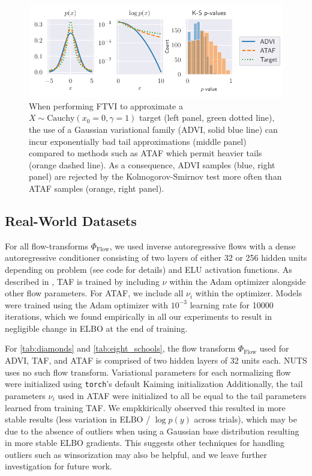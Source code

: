 \documentclass[../../thesis.tex]{subfiles}
\begin{document}
\begin{figure}[htbp]
  \centering
  \includegraphics{ftvi/Figures/fat_tail_ks.pdf}
  \caption{
    When performing FTVI to approximate a $X \sim \text{Cauchy}(x_0 = 0, \gamma = 1)$ target (left panel, green dotted line),
    the use of a Gaussian variational family (ADVI, solid blue line) can incur
    exponentially bad tail approximations (middle panel) compared to
    methods such as ATAF which permit heavier tails (orange dashed line).
    As a consequence, ADVI samples (blue, right panel) are rejected by
    the Kolmogorov-Smirnov test more often than ATAF samples (orange, right panel).
  }
  \label{fig:cauchy_normal_student}
\end{figure}

\subsection{Real-World Datasets}

For all flow-transforms $\Phi_{\text{Flow}}$, we used inverse autoregressive flows \citep{kingma2016improved} with a
dense autoregressive conditioner consisting of two layers of either 32 or 256 hidden units depending on problem (see code for details) and
ELU activation functions.
As described in \citet{jaini2020tails}, TAF is trained by including $\nu$ within the Adam optimizer alongside other flow parameters. For ATAF, we include all $\nu_i$ within the optimizer.
Models were trained using the Adam optimizer with $10^{-3}$ learning rate
for 10000 iterations, which we found empirically in all our experiments to result in negligible change in ELBO
at the end of training.

For \cref{tab:diamonds} and \cref{tab:eight_schools}, the flow transform $\Phi_{\text{Flow}}$ used for ADVI, TAF, and ATAF
is comprised of two hidden layers of 32 units each. NUTS uses no such flow transform. Variational parameters for each normalizing flow were initialized
using \texttt{torch}'s default Kaiming initialization \citep{he2015delving} Additionally, the tail parameters $\nu_i$
used in ATAF were initialized to all be equal to the tail parameters learned from training TAF. We empkkirically observed
this resulted in more stable results (less variation in ELBO / $\log p(y)$ across trials), which may be due to
the absence of outliers when using a Gaussian base distribution resulting in more stable ELBO gradients. This suggests
other techniques for handling outliers such as winsorization may also be helpful, and we leave further investigation
for future work.
\end{document}
